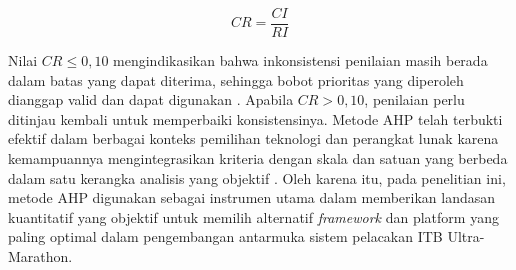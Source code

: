 $$CR = \frac{CI}{RI}$$

Nilai $CR \leq 0{,}10$ mengindikasikan bahwa inkonsistensi penilaian masih berada dalam batas yang dapat diterima, sehingga bobot prioritas yang diperoleh dianggap valid dan dapat digunakan \cite{Saaty1980}. Apabila $CR > 0{,}10$, penilaian perlu ditinjau kembali untuk memperbaiki konsistensinya. Metode AHP telah terbukti efektif dalam berbagai konteks pemilihan teknologi dan perangkat lunak karena kemampuannya mengintegrasikan kriteria dengan skala dan satuan yang berbeda dalam satu kerangka analisis yang objektif \cite{Vaidya2006}. Oleh karena itu, pada penelitian ini, metode AHP digunakan sebagai instrumen utama dalam memberikan landasan kuantitatif yang objektif untuk memilih alternatif \textit{framework} dan platform yang paling optimal dalam pengembangan antarmuka sistem pelacakan ITB Ultra-Marathon.
 
 
 
 
